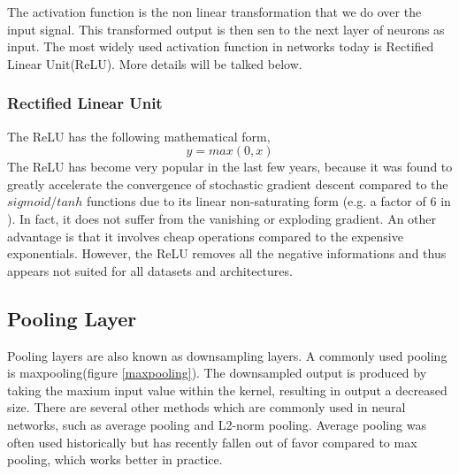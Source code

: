     The activation function is the non linear transformation that we do over the input signal. This transformed output is then sen to the next layer of neurons as input. The most widely used activation function in networks today is Rectified Linear Unit(ReLU). More details will be talked below. 

    \subsubsection{Rectified Linear Unit}
    The ReLU has the following mathematical form,
    \begin{equation}
        y = max(0, x)
    \end{equation}
    The ReLU has become very popular in the last few years, because it was found to greatly accelerate the convergence of stochastic gradient descent compared to the $sigmoid$/$tanh$ functions due to its linear non-saturating form (e.g. a factor of 6 in \cite{krizhevsky2012imagenet}). In fact, it does not suffer from the vanishing or exploding gradient. An other advantage is that it involves cheap operations compared to the expensive exponentials. However, the ReLU removes all the negative informations and thus appears not suited for all datasets and architectures.

    \subsection{Pooling Layer}
    Pooling layers are also known as downsampling layers. A commonly used pooling is maxpooling(figure \ref{maxpooling}). The downsampled output is produced by taking the maxium input value within the kernel, resulting in output a decreased size. There are several other methods which are commonly used in neural networks, such as average pooling and L2-norm pooling. Average pooling was often used historically but has recently fallen out of favor compared to max pooling, which works better in practice\cite{scherer2010evaluation}.\\

